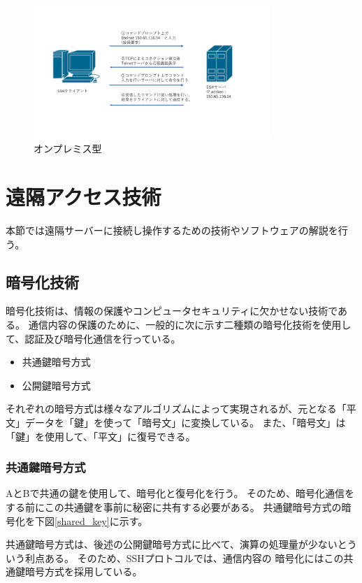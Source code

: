 \documentclass[12pt,a4paper,titlepage]{jsarticle}
\begin{document}
\begin{figure}[h]
    \centering
    \includegraphics*[width=0.8\textwidth,page=15]{graphs/network_archtecture.pdf}
    \caption{オンプレミス型}
    \label{onpremise_graph}
\end{figure}




\section{遠隔アクセス技術}
本節では遠隔サーバーに接続し操作するための技術やソフトウェアの解説を行う。

\subsection{暗号化技術}
暗号化技術は、情報の保護やコンピュータセキュリティに欠かせない技術である。
通信内容の保護のために、一般的に次に示す二種類の暗号化技術を使用して、認証及び暗号化通信を行っている。
\begin{itemize}
    \item 共通鍵暗号方式
    \item 公開鍵暗号方式
\end{itemize}
それぞれの暗号方式は様々なアルゴリズムによって実現されるが、元となる「平文」データを「鍵」を使って「暗号文」に変換している。
また、「暗号文」は「鍵」を使用して、「平文」に復号できる。

\subsubsection{共通鍵暗号方式}
AとBで共通の鍵を使用して、暗号化と復号化を行う。
そのため、暗号化通信をする前にこの共通鍵を事前に秘密に共有する必要がある。
共通鍵暗号方式の暗号化を下図\ref{shared_key}に示す。

共通鍵暗号方式は、後述の公開鍵暗号方式に比べて、演算の処理量が少ないとういう利点ある。
そのため、SSHプロトコルでは、通信内容の
暗号化にはこの共通鍵暗号方式を採用している。
\end{document}
